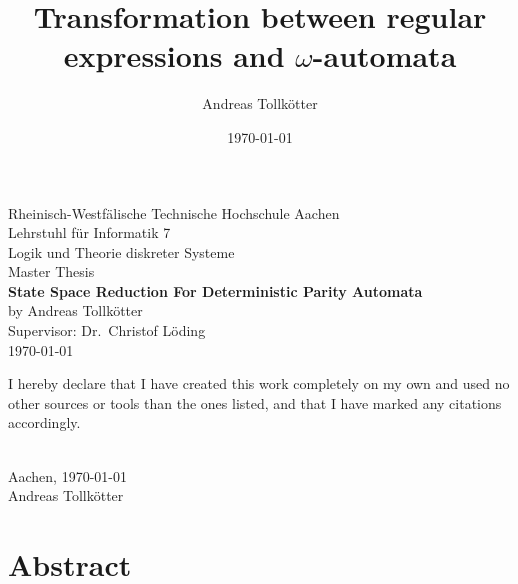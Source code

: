 \title{Transformation between regular expressions and $\omega$-automata}
\author{Andreas Tollkötter}
\date{\today}

\pagestyle{empty}
\begin{titlepage}
\begin{center}
	\vspace*{\fill}
		\LARGE Rheinisch-Westfälische Technische Hochschule Aachen \\
	\vspace*{1cm}
		\LARGE Lehrstuhl für Informatik 7 \\
		\Large Logik und Theorie diskreter Systeme \\
	\vspace*{2cm}
		\LARGE Master Thesis \\
	\vspace*{5mm}
		\huge \textbf{State Space Reduction For Deterministic Parity Automata} \\
	\vspace*{1cm}
		\Large by Andreas Tollkötter \\
	\vspace*{5mm}
		\Large Supervisor: Dr.\ Christof Löding \\
	\vspace*{2cm}
		\large \today 
	\vspace*{\fill}
\end{center}
\end{titlepage}



\par\vspace*{\fill}
\noindent
I hereby declare that I have created this work completely on
my own and used no other sources or tools than the ones
listed, and that I have marked any citations accordingly. \\
\vspace*{1cm}

\begin{flushright}
\underline{\hspace{5cm}} \\
Aachen, \today \\
Andreas Tollkötter
\end{flushright}



\chapter*{Abstract}




